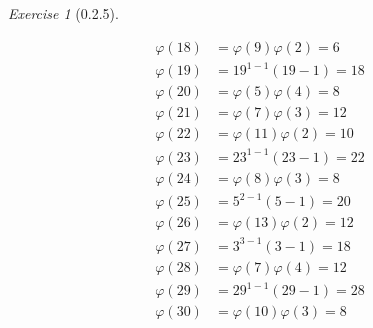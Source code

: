 \documentclass[12pt]{amsart}
\makeatletter
\theoremstyle{remark}
\newtheorem*{exercise}{Exercise}%
\renewenvironment{proof}[1][\proofname]{\par\doublespacing
  \pushQED{\qed}%
  \normalfont \topsep6\p@\@plus6\p@\relax
  \list{}{%
    \settowidth{\leftmargin}{\itshape\proofname:\hskip\labelsep}%
    \setlength{\labelwidth}{0pt}%
    \setlength{\itemindent}{-\leftmargin}%
  }%
  \item[\hskip\labelsep\itshape#1\@addpunct{:}]\ignorespaces
}{%
  \popQED\endlist\@endpefalse
  \singlespacing
}
\theoremstyle{mycomment}
\makeatother
\begin{document}
\begin{exercise}[0.2.5]
\begin{proof}[Solution:]
\begin{center}
\begin{minipage}{.45\textwidth}
\begin{align*}
      \varphi(18) &= \varphi(9)\varphi(2) = 6\\
      \varphi(19) &= 19^{1-1}(19-1) = 18\\
      \varphi(20) &= \varphi(5)\varphi(4) = 8\\ 
      \varphi(21) &= \varphi(7)\varphi(3) = 12\\ 
      \varphi(22) &= \varphi(11)\varphi(2) = 10\\ 
      \varphi(23) &= 23^{1-1}(23-1) = 22\\
      \varphi(24) &= \varphi(8)\varphi(3) = 8\\
      \varphi(25) &= 5^{2-1}(5-1) = 20\\
      \varphi(26) &= \varphi(13)\varphi(2) = 12\\
      \varphi(27) &= 3^{3-1}(3-1) = 18\\
      \varphi(28) &= \varphi(7)\varphi(4) = 12\\
      \varphi(29) &= 29^{1-1}(29-1) = 28\\
      \varphi(30) &= \varphi(10) \varphi(3) = 8
    \end{align*}
  \end{minipage}
\end{center}
  
  \end{proof}
  \end{exercise}
\end{document}
